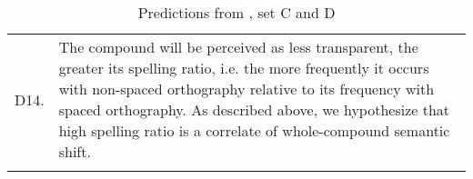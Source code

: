 \begin{table}[p]
\begin{tabularx}{\textwidth}{lQ}
D14.&The compound will be perceived as less transparent, the greater its spelling ratio, i.e. the more frequently it occurs with non-spaced orthography relative to its frequency with spaced orthography. As described above, we hypothesize that high spelling ratio is a correlate of whole-compound semantic shift.\\\lspbottomrule
\end{tabularx}
\caption[Predictions]{Predictions from \citet{BellandSchaefer:2016}, set C and D}
\label{tab:predictions-CD}
\end{table}


